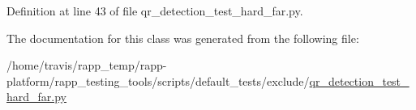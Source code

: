 Definition at line 43 of file qr\-\_\-detection\-\_\-test\-\_\-hard\-\_\-far.\-py.



The documentation for this class was generated from the following file\-:\begin{DoxyCompactItemize}
\item 
/home/travis/rapp\-\_\-temp/rapp-\/platform/rapp\-\_\-testing\-\_\-tools/scripts/default\-\_\-tests/exclude/\hyperlink{qr__detection__test__hard__far_8py}{qr\-\_\-detection\-\_\-test\-\_\-hard\-\_\-far.\-py}\end{DoxyCompactItemize}
